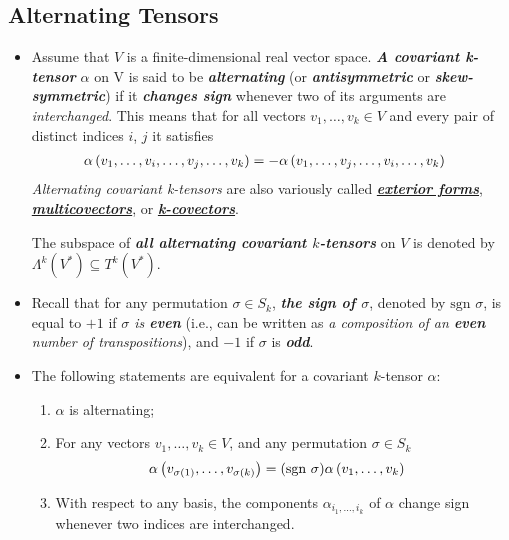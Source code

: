 \documentclass[11pt]{article}
\begin{document}
\subsection{Alternating Tensors}
\begin{itemize}
\item \begin{definition}
Assume that $V$ is a finite-dimensional real vector space. \emph{\textbf{A covariant k-tensor}} $\alpha$ on V is said to be \emph{\textbf{alternating}} (or \emph{\textbf{antisymmetric}} or \emph{\textbf{skew-symmetric}}) if it \emph{\textbf{changes sign}} whenever two of its arguments are \emph{interchanged}. This means that for all vectors $v_1,\ldots,v_k \in V$ and every pair of distinct indices $i$, $j$ it satisfies
\begin{align*}
\alpha\left(v_1, \ldots, v_i, \ldots, v_j, \ldots, v_k\right) &= -\alpha\left(v_1, \ldots, v_j, \ldots, v_i, \ldots, v_k\right) 
\end{align*}
\emph{Alternating covariant k-tensors} are also variously called \underline{\emph{\textbf{exterior forms}}, \emph{\textbf{multicovectors}}}, or \underline{\emph{\textbf{k-covectors}}}. 

The subspace of \emph{\textbf{all alternating covariant $k$-tensors}} on $V$ is denoted by \underline{$\Lambda^{k}(V^{*}) \subseteq T^k(V^{*}) $}.
\end{definition}

\item \begin{definition}
Recall that for any permutation $\sigma \in S_k$, \emph{\textbf{the sign of $\sigma$}}, denoted by $\text{sgn }\sigma$, is equal to $+1$ if \emph{$\sigma$ is \textbf{even}} (i.e., can be written as \emph{a composition of an \textbf{even} number of transpositions}), and $-1$ if $\sigma$ is \emph{\textbf{odd}}.
\end{definition}

\item 
\begin{remark}
The following statements are equivalent for a covariant $k$-tensor $\alpha$:
\begin{enumerate}
\item $\alpha$ is alternating;
\item For any vectors $v_1,\ldots,v_k \in V$, and any permutation $\sigma \in S_k$
\begin{align*}
\alpha\left(v_{\sigma(1)}, \ldots,  v_{\sigma(k)}\right) &=(\text{sgn }\sigma)\alpha\left(v_1, \ldots,  v_k\right)
\end{align*}
\item With respect to any basis, the components $\alpha_{i_1,\ldots,i_k}$ of $\alpha$ change sign whenever two indices are interchanged.
\end{enumerate}
\end{remark}


\end{itemize}
\end{document}
